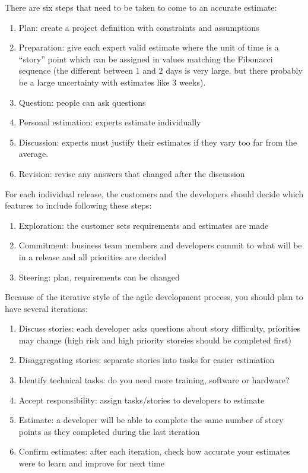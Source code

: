 There are six steps that need to be taken to come to an accurate estimate:
\begin{enumerate}
    \item Plan: create a project definition with constraints and assumptions
    \item Preparation: give each expert valid estimate where the unit of time is a ``story'' point which can be assigned in values matching the Fibonacci sequence (the different between \(1\) and \(2\) days is very large, but there probably be a large uncertainty with estimates like \(3\) weeks).
    \item Question: people can ask questions
    \item Personal estimation: experts estimate individually
    \item Discussion: experts must justify their estimates if they vary too far from the average.
    \item Revision: revise any answers that changed after the discussion
\end{enumerate}
For each individual release, the customers and the developers should decide which features to include following these steps:
\begin{enumerate}
    \item Exploration: the customer sets requirements and estimates are made
    \item Commitment: business team members and developers commit to what will be in a release and all priorities are decided
    \item Steering: plan, requirements can be changed
\end{enumerate}
Because of the iterative style of the agile development process, you should plan to have several iterations:
\begin{enumerate}
    \item Discuss stories: each developer asks questions about story difficulty, priorities may change (high risk and high priority storeies should be completed first)
    \item Disaggregating stories: separate stories into tasks for easier estimation
    \item Identify technical tasks: do you need more training, software or hardware?
    \item Accept responsibility: assign tasks/stories to developers to estimate
    \item Estimate: a developer will be able to complete the same number of story points as they completed during the last iteration
    \item Confirm estimates: after each iteration, check how accurate your estimates were to learn and improve for next time
\end{enumerate}

